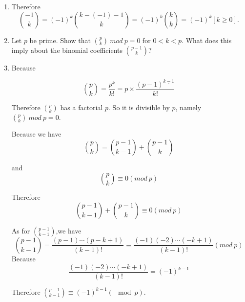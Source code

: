 \documentclass[12pt,a4paper]{article}
\makeatletter
\newtheorem*{solution}{Solution}
\theoremstyle{definition}
\renewenvironment{solution}[1][Solution] {\par\pushQED{\qed}\normalfont\topsep6\p@\@plus6\p@\relax\trivlist\item[\hskip\labelsep\bfseries#1\@addpunct{.}]\ignorespaces}{\popQED\endtrivlist\@endpefalse} \makeatother
\makeatother
\begin{document}
\begin{enumerate}
\begin{solution}
        	Therefore
        	\begin{equation*}
        	    \binom{-1}{k}=(-1)^k\binom{k-(-1)-1}{k}=(-1)^k\binom{k}{k}=(-1)^k[k\ge 0].
        	\end{equation*}
        \end{solution}
    \item 
        Let $p$ be prime. Show that $\binom{p}{k}\ mod\ p=0$ for $0<k<p$. What does this imply about the binomial coefficients $\binom{p-1}{k}$?
        \begin{solution}
        	Because
        	
        	\begin{equation*}
        	\binom{p}{k}=\frac{p^{\underline{k}}}{k!}=p\times\frac{(p-1)^{\underline{k-1}}}{k!}        	\end{equation*}
        	
        Therefore $\binom{p}{k}$ has a factorial $p$. So it is divisible by $p$, namely $\binom{p}{k}\ mod\ p=0$.
        
        Because we have
        \begin{equation*}
            \binom{p}{k}=\binom{p-1}{k-1}+\binom{p-1}{k}
        \end{equation*}
        
        and
        \begin{equation*}
            \binom{p}{k}\equiv 0(mod\ p)
        \end{equation*}
        
        Therefore
        \begin{equation}\label{EQ}
            \binom{p-1}{k-1}+\binom{p-1}{k}\equiv 0(mod\ p)
        \end{equation}
        
        As for $\binom{p-1}{k-1}$,we have
        \begin{equation*}
            \binom{p-1}{k-1}=\frac{(p-1)\cdots(p-k+1)}{(k-1)!}\equiv\frac{(-1)(-2)\cdots(-k+1)}{(k-1)!}(mod\ p)
        \end{equation*}
        Because
        \begin{equation*}
            \frac{(-1)(-2)\cdots(-k+1)}{(k-1)!}=(-1)^{k-1}
        \end{equation*}
        
        Therefore $\binom{p-1}{k-1}\equiv (-1)^{k-1}(\mod p)$.
        

\end{solution}
\end{enumerate}
\end{document}
